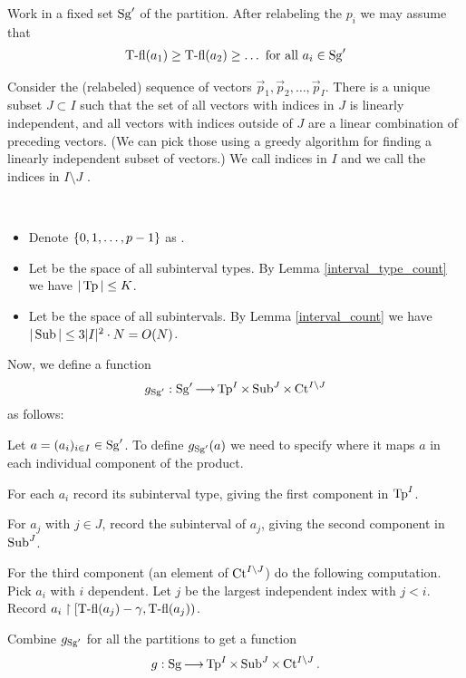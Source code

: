 Work in a fixed set $\operatorname{Sg}'$ of the partition.
After relabeling the $p_i$ we may assume that
\begin{align*}
  \operatorname{T-fl}(a_1) \geq \operatorname{T-fl}(a_2) \geq \ldots \text { for all $a_i \in \operatorname{Sg}'$}
\end{align*}

Consider the (relabeled) sequence of vectors $\vec p_1, \vec p_2, \ldots, \vec p_I$.
There is a unique subset $J \subset I$ such that the set of all vectors with indices in $J$ is linearly independent,
and all vectors with indices outside of $J$ are a linear combination of preceding vectors.
(We can pick those using a greedy algorithm for finding a linearly independent subset of vectors.)
We call indices in $I$  and we call the indices in $I \setminus J$ .


\begin{Definition} \ 
  \begin{itemize}
  \item Denote $\left\{0,1, \ldots, p-1\right\}$ as .
  \item Let  be the space of all subinterval types.
    By Lemma \ref{interval_type_count} we have $|\operatorname{Tp}| \leq K$.
  \item Let  be the space of all subintervals.
    By Lemma \ref{interval_count} we have $|\operatorname{Sub}| \leq 3 |I|^2 \cdot N = O(N)$.
  \end{itemize}
\end{Definition}

\begin{Definition}
  Now, we define a function
  \begin{align*}
    g_{\operatorname{Sg}'}: \operatorname{Sg}' \operatorname{\longrightarrow} \operatorname{Tp}^I \times \operatorname{Sub}^J \times \operatorname{Ct}^{I \backslash J}
  \end{align*}
  as follows:
  
  Let $a = (a_i)_{i\in I} \in \operatorname{Sg}'$.
  To define $g_{\operatorname{Sg}'}(a)$ we need to specify where it maps $a$ in each individual component of the product.

  For each $a_i$ record its subinterval type, giving the first component in $\operatorname{Tp}^I$.

  For $a_j$ with $j \in J$, record the subinterval of $a_j$, giving the second component in $\operatorname{Sub}^J$.

  For the third component (an element of $\operatorname{Ct}^{I \backslash J}$) do the following computation.
  Pick $a_i$ with $i$ dependent.
  Let $j$ be the largest independent index with $j < i$.
  Record $a_i \upharpoonright [\operatorname{T-fl}(a_j) - \gamma, \operatorname{T-fl}(a_j))$.

  Combine $g_{\operatorname{Sg}'}$ for all the partitions to get a function 
  \begin{align*}
    g: \operatorname{Sg} \operatorname{\longrightarrow} \operatorname{Tp}^I \times \operatorname{Sub}^J \times \operatorname{Ct}^{I \backslash J}.  
  \end{align*}
\end{Definition}

